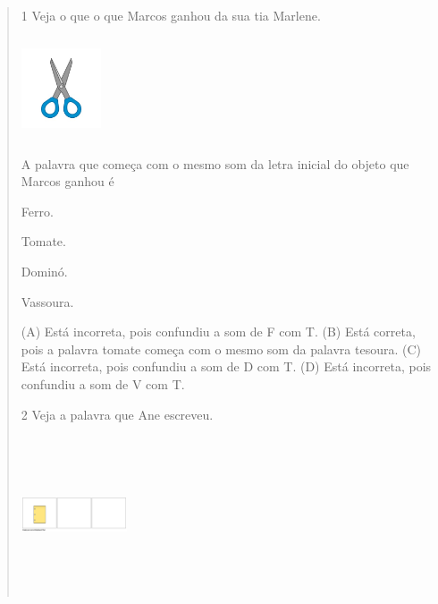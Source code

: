 \begin{verse}
\num{1} Veja o que o que Marcos ganhou da sua tia Marlene.

\includegraphics[width=0.92708in,height=1.18125in]{media/image163.jpeg}


A palavra que começa com o mesmo som da letra inicial do objeto que
Marcos ganhou é

\begin{minipage}{.5\textwidth}
\begin{escolha}
\item Ferro.

\item Tomate.

\item Dominó.

\item Vassoura.
\end{escolha}
\end{minipage}

(A) Está incorreta, pois confundiu a som de F com T.
(B) Está correta, pois a palavra tomate começa com o mesmo som da palavra tesoura.
(C) Está incorreta, pois confundiu a som de D com T.
(D) Está incorreta, pois confundiu a som de V com T.

\num{2} Veja a palavra que Ane escreveu.

\includegraphics[width=1.22986in,height=1.82986in]{media/image164.png}


\end{verse}
